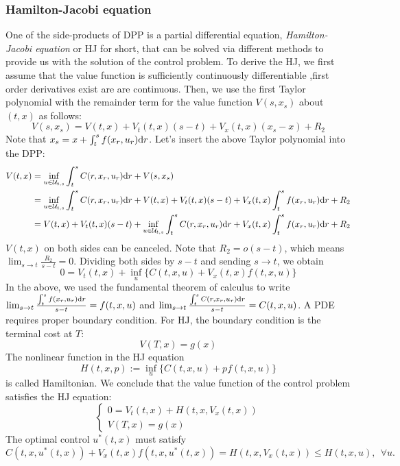 \documentclass[11pt]{book}
\newcommand{\dr}{\text{\normalfont d}r}
\begin{document}
\subsubsection{Hamilton-Jacobi equation}
One of the side-products of DPP is a partial differential equation, \emph{Hamilton-Jacobi equation} or HJ for short, that can be solved via different methods to provide us with the solution of the control problem. 
To derive the HJ, we first assume that the value function is sufficiently continuously differentiable ,first order derivatives exist are are continuous. Then, we use the first Taylor polynomial with the remainder term for the value function $V(s,x_s)$ about $(t,x)$ as follows:
\[
V(s,x_s) = V(t,x) + V_t(t,x)(s-t) + V_x(t,x)(x_s-x) + R_2
\]
Note that $x_s=x+\int_t^s f(x_r,u_r){{\dr}}$. Let's insert the above Taylor polynomial into the DPP:
\[
\begin{split}
    V(t,x) & =\inf_{u\in\mathcal{U}_{t,s}}\int_t^sC(r,x_r,u_r){{\dr}}+V(s,x_s)\\
    & = \inf_{u\in\mathcal{U}_{t,s}}\int_t^sC(r,x_r,u_r){{\dr}}+V(t,x) + V_t(t,x)(s-t) + V_x(t,x)\int_t^s f(x_r,u_r){{\dr}} + R_2\\
    &= V(t,x) + V_t(t,x)(s-t) +\inf_{u\in\mathcal{U}_{t,s}}\int_t^sC(r,x_r,u_r){{\dr}} + V_x(t,x)\int_t^s f(x_r,u_r){{\dr}} + R_2\\
\end{split}
\]
$V(t,x)$ on both sides can be canceled. Note that $R_2=o(s-t)$, which means $\lim_{s\to t} \frac{R_2}{s-t}=0$.
Dividing both sides by $s-t$ and sending $s\to t$, we obtain
\begin{equation}\label{eqn:HJ_deterministic}
        0 = V_t(t,x) +\inf_{u} \{C(t,x,u) + V_x(t,x)f(t,x,u)\}
\end{equation}
In the above, we used the fundamental theorem of calculus to write $\lim_{s\to t} \frac{\int_t^s f(x_r,u_r){{\dr}}}{s-t}=f(t,x,u)$ and $\lim_{s\to t} \frac{\int_t^sC(r,x_r,u_r){{\dr}}}{s-t}=C(t,x,u)$.
A PDE requires proper boundary condition. For HJ, the boundary condition is the terminal cost at $T$:
\begin{equation}
    \label{eqn:HJ_terminal}
    V(T,x)=g(x)
\end{equation}
The nonlinear function in the HJ equation
\begin{equation}
    H(t,x,p):=\inf_{u} \{C(t,x,u) + pf(t,x,u)\}
\end{equation}
is called Hamiltonian.
We conclude that the value function of the control problem satisfies the HJ equation: 
\begin{equation}
    \label{eqn:HJ_w_Hamiltonian}
    \begin{cases}
        0=V_t(t,x)+H(t,x,V_x(t,x))\\
        V(T,x)=g(x)
    \end{cases}
\end{equation}
The optimal control $u^*(t,x)$ must satisfy
\begin{equation}\label{cond:optimality_deterministic}
C(t,x,u^*(t,x)) + V_x(t,x)f(t,x,u^*(t,x)) = H(t,x,V_x(t,x))\le H(t,x,u),~~\forall u.
\end{equation}
\end{document}
